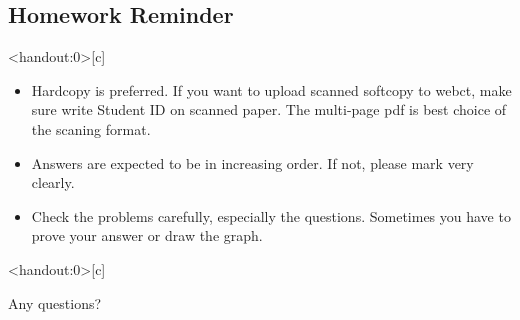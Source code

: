 \documentclass[
        ]{beamer}
\begin{document}
        
        

    \subsection{Homework Reminder}
        \begin{frame}<handout:0>[c]{\subsecname}
            \begin{itemize}[<+-|alert@+>]
            	\item Hardcopy is preferred. If you want to upload scanned softcopy to webct, make sure write Student ID on scanned paper. The multi-page pdf is best choice of the scaning format.
            	\item Answers are expected to be in increasing order. If not, please mark very clearly.
            	\item Check the problems carefully, especially the questions. Sometimes you have to prove your answer or draw the graph.
            \end{itemize}
        \end{frame}
    
    \begin{frame}<handout:0>[c]{\secname}
        \centerline{\Large{Any questions?}}
    \end{frame}
    
    
    
\end{document}
